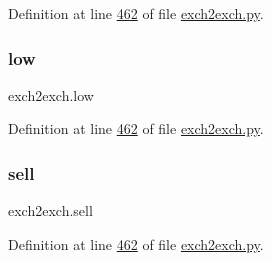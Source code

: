 Definition at line \hyperlink{exch2exch_8py_source_l00462}{462} of file \hyperlink{exch2exch_8py_source}{exch2exch.\+py}.

\mbox{\label{namespaceexch2exch_a4ac63aa243bfdafff14b150c675ad9bc}} 
\subsubsection{\texorpdfstring{low}{low}}
{\footnotesize\ttfamily exch2exch.\+low}



Definition at line \hyperlink{exch2exch_8py_source_l00462}{462} of file \hyperlink{exch2exch_8py_source}{exch2exch.\+py}.

\mbox{\label{namespaceexch2exch_a66d338f409060f7cbcb49da894f5c3e4}} 
\subsubsection{\texorpdfstring{sell}{sell}}
{\footnotesize\ttfamily exch2exch.\+sell}



Definition at line \hyperlink{exch2exch_8py_source_l00462}{462} of file \hyperlink{exch2exch_8py_source}{exch2exch.\+py}.

